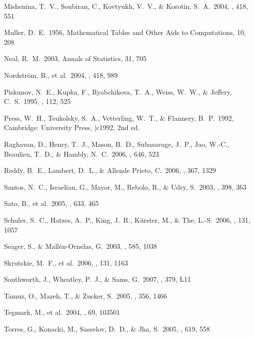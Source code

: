 \documentclass{emulateapj}
\begin{document}
\begin{thebibliography}
 Mishenina, T.~V., 
Soubiran, C., Kovtyukh, V.~V., \& Korotin, S.~A.\ 2004, \aap, 418, 551

 Muller, D.~E.\ 1956, Mathematical Tables and Other Aids to Computations, 10, 208

 Neal, R.~M.\ 2003, Annals of Statistics, 31, 705

 Nordstr{\"o}m, 
B., et al.\ 2004, \aap, 418, 989 

 Piskunov, N.~E., 
Kupka, F., Ryabchikova, T.~A., Weiss, W.~W., \& Jeffery, C.~S.\ 1995, 
\aaps, 112, 525 

 Press, W.~H., Teukolsky, 
S.~A., Vetterling, W.~T., \& Flannery, B.~P.\ 1992, Cambridge: University 
Press, |c1992, 2nd ed.

 Raghavan, D., Henry, 
T.~J., Mason, B.~D., Subasavage, J.~P., Jao, W.-C., Beaulieu, T.~D., \& 
Hambly, N.~C.\ 2006, \apj, 646, 523

 Reddy, B.~E., Lambert, 
D.~L., \& Allende Prieto, C.\ 2006, \mnras, 367, 1329 

 Santos, N.~C., 
Israelian, G., Mayor, M., Rebolo, R., \& Udry, S.\ 2003, \aap, 398, 363

 Sato, B., et al.\ 2005, 
\apj, 633, 465 

 Schuler, S.~C., Hatzes, 
A.~P., King, J.~R., K{\"u}rster, M., \& The, L.-S.\ 2006, \aj, 131, 1057

 Seager, 
S., \& Mall{\'e}n-Ornelas, G.\ 2003, \apj, 585, 1038 

 Skrutskie, M.~F., et 
al.\ 2006, \aj, 131, 1163 

 Southworth, J., 
Wheatley, P.~J., \& Sams, G.\ 2007, \mnras, 379, L11 

 Tamuz, O., Mazeh, T., \& 
Zucker, S.\ 2005, \mnras, 356, 1466 

 Tegmark, M., et al.\ 
2004, \prd, 69, 103501

 Torres, G., Konacki, M., 
Sasselov, D.~D., \& Jha, S.\ 2005, \apj, 619, 558 


\end{thebibliography}
\end{document}
